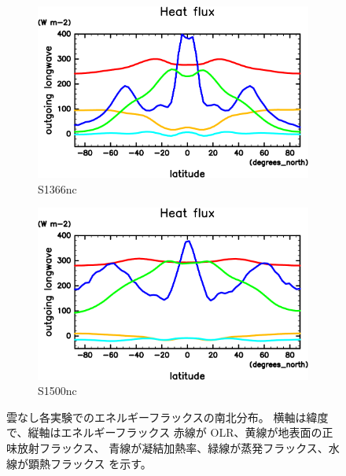\documentclass[body]{subfiles}
\begin{document}
\begin{figure}[t]
	\centering
	\begin{subfigure}{.4\textwidth}
		\centering
		\includegraphics[width=\columnwidth]{S1366-nc/HeatFlx,time=3650:4015-crop-rotate.pdf}
		\caption{S1366nc}\label{EnFlx南北分布S1366nc}
	\end{subfigure}
	\begin{subfigure}{.4\textwidth}
		\centering
		\includegraphics[width=\columnwidth]{S1500-nc/HeatFlx,time=3650:4015-crop-rotate.pdf}
		\caption{S1500nc}\label{EnFlx南北分布S1500nc}
	\end{subfigure}
	\caption[雲なし各実験でのエネルギーフラックス南北分布]{
		雲なし各実験でのエネルギーフラックスの南北分布。
		横軸は緯度で、縦軸はエネルギーフラックス\hmu*{[W/m^{-2}]}
		赤線が OLR、黄線が地表面の正味放射フラックス、
		青線が凝結加熱率、緑線が蒸発フラックス、水線が顕熱フラックス
		を示す。
	}\label{EnFlx南北分布nc}
\end{figure}
\end{document}

